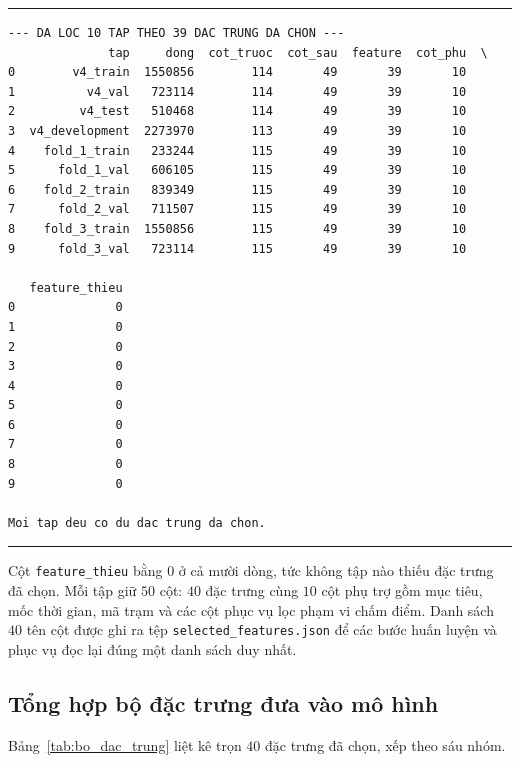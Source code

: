 \documentclass[12pt, a4paper]{report}
\begin{document}
\begingroup
\par\vspace{6pt}\hrule\vspace{4pt}
\small\renewcommand{\baselinestretch}{1.0}\selectfont
\begin{verbatim}
--- DA LOC 10 TAP THEO 39 DAC TRUNG DA CHON ---
              tap     dong  cot_truoc  cot_sau  feature  cot_phu  \
0        v4_train  1550856        114       49       39       10   
1          v4_val   723114        114       49       39       10   
2         v4_test   510468        114       49       39       10   
3  v4_development  2273970        113       49       39       10   
4    fold_1_train   233244        115       49       39       10   
5      fold_1_val   606105        115       49       39       10   
6    fold_2_train   839349        115       49       39       10   
7      fold_2_val   711507        115       49       39       10   
8    fold_3_train  1550856        115       49       39       10   
9      fold_3_val   723114        115       49       39       10   

   feature_thieu  
0              0  
1              0  
2              0  
3              0  
4              0  
5              0  
6              0  
7              0  
8              0  
9              0  

Moi tap deu co du dac trung da chon.
\end{verbatim}
\vspace{2pt}\hrule\par\vspace{6pt}
\endgroup

Cột \texttt{feature\_thieu} bằng $0$ ở cả mười dòng, tức không tập nào thiếu đặc trưng đã chọn.
Mỗi tập giữ $50$ cột: $40$ đặc trưng cùng $10$ cột phụ trợ gồm mục tiêu, mốc thời gian, mã trạm
và các cột phục vụ lọc phạm vi chấm điểm. Danh sách $40$ tên cột được ghi ra tệp
\texttt{selected\_features.json} để các bước huấn luyện và phục vụ đọc lại đúng một danh sách duy
nhất.

\subsection{Tổng hợp bộ đặc trưng đưa vào mô hình}

Bảng~\ref{tab:bo_dac_trung} liệt kê trọn $40$ đặc trưng đã chọn, xếp theo sáu nhóm.
\end{document}
